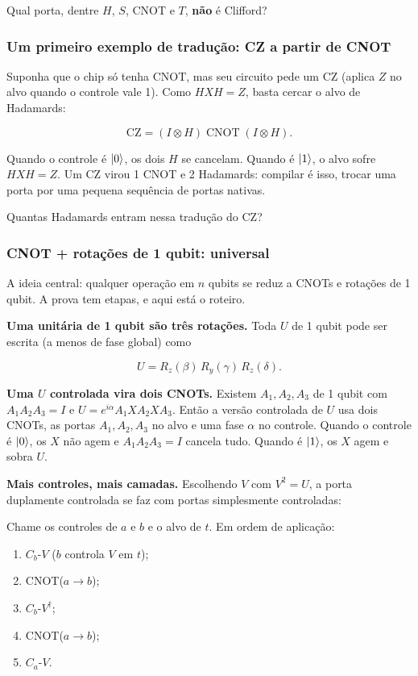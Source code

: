 Qual porta, dentre \(H\), \(S\), CNOT e \(T\), \textbf{não} é Clifford?

\subsubsection{Um primeiro exemplo de tradução: CZ a partir de CNOT}\label{um-primeiro-exemplo-de-traduuxe7uxe3o-cz-a-partir-de-cnot}

Suponha que o chip só tenha CNOT, mas seu circuito pede um CZ (aplica \(Z\) no alvo quando o controle vale 1). Como \(HXH = Z\), basta cercar o alvo de Hadamards:

\[
\text{CZ} = (I\otimes H)\;\text{CNOT}\;(I\otimes H).
\]

Quando o controle é \(\left|{0}\right>\), os dois \(H\) se cancelam. Quando é \(\left|{1}\right>\), o alvo sofre \(HXH=Z\). Um CZ virou 1 CNOT e 2 Hadamards: compilar é isso, trocar uma porta por uma pequena sequência de portas nativas.

Quantas Hadamards entram nessa tradução do CZ?

\subsubsection{CNOT + rotações de 1 qubit: universal}\label{cnot-rotauxe7uxf5es-de-1-qubit-universal}

A ideia central: qualquer operação em \(n\) qubits se reduz a CNOTs e rotações de 1 qubit. A prova tem etapas, e aqui está o roteiro.

\textbf{Uma unitária de 1 qubit são três rotações.} Toda \(U\) de 1 qubit pode ser escrita (a menos de fase global) como

\[
U = R_z(\beta)\,R_y(\gamma)\,R_z(\delta).
\]

\textbf{Uma \(U\) controlada vira dois CNOTs.} Existem \(A_1,A_2,A_3\) de 1 qubit com \(A_1A_2A_3 = I\) e \(U = e^{i\alpha}A_1XA_2XA_3\). Então a versão controlada de \(U\) usa dois CNOTs, as portas \(A_1,A_2,A_3\) no alvo e uma fase \(\alpha\) no controle. Quando o controle é \(\left|{0}\right>\), os \(X\) não agem e \(A_1A_2A_3=I\) cancela tudo. Quando é \(\left|{1}\right>\), os \(X\) agem e sobra \(U\).

\textbf{Mais controles, mais camadas.} Escolhendo \(V\) com \(V^2=U\), a porta duplamente controlada se faz com portas simplesmente controladas:

Chame os controles de \(a\) e \(b\) e o alvo de \(t\). Em ordem de aplicação:

\begin{enumerate}
\def\labelenumi{\arabic{enumi}.}
\tightlist
\item
  \(C_b\text{-}V\) (\(b\) controla \(V\) em \(t\));
\item
  CNOT(\(a\to b\));
\item
  \(C_b\text{-}V^{\dagger}\);
\item
  CNOT(\(a\to b\));
\item
  \(C_a\text{-}V\).
\end{enumerate}

